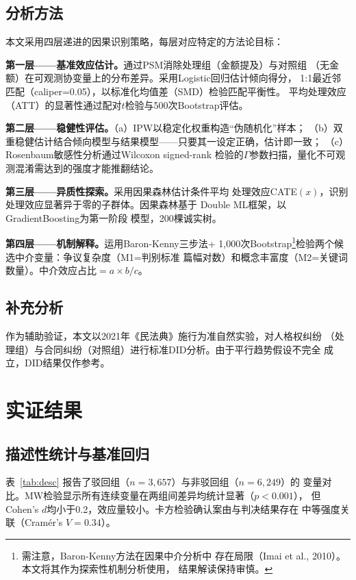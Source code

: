 \documentclass[12pt,a4paper,twoside]{ctexart}
\newcommand{\tabref}[1]{表~\ref{tab:#1}}
\begin{document}
\subsection{分析方法}

本文采用四层递进的因果识别策略，每层对应特定的方法论目标：

\textbf{第一层——基准效应估计。}通过PSM消除处理组（金额提及）与对照组
（无金额）在可观测协变量上的分布差异。采用Logistic回归估计倾向得分，
1:1最近邻匹配（caliper=0.05），以标准化均值差（SMD）检验匹配平衡性。
平均处理效应（ATT）的显著性通过配对$t$检验与500次Bootstrap评估。

\textbf{第二层——稳健性评估。}（a）IPW以稳定化权重构造``伪随机化''样本；
（b）双重稳健估计结合倾向模型与结果模型——只要其一设定正确，估计即一致；
（c）Rosenbaum敏感性分析\cite{rosenbaum1983}通过Wilcoxon signed-rank
检验的$\Gamma$参数扫描，量化不可观测混淆需达到的强度才能推翻结论。

\textbf{第三层——异质性探索。}采用因果森林\cite{wager2018}估计条件平均
处理效应CATE$(x)$，识别处理效应显著异于零的子群体。因果森林基于
Double ML框架\cite{chernozhukov2018}，以GradientBoosting为第一阶段
模型，200棵诚实树。

\textbf{第四层——机制解释。}运用Baron-Kenny三步法\cite{baron1986}+
1,000次Bootstrap\footnote{需注意，Baron-Kenny方法在因果中介分析中
存在局限（Imai et al., 2010）。本文将其作为探索性机制分析使用，
结果解读保持审慎。}检验两个候选中介变量：争议复杂度（M1=判别标准
篇幅对数）和概念丰富度（M2=关键词数量）。中介效应占比$=a\times b / c$。

\subsection{补充分析}

作为辅助验证，本文以2021年《民法典》施行为准自然实验，对人格权纠纷
（处理组）与合同纠纷（对照组）进行标准DID分析。由于平行趋势假设不完全
成立，DID结果仅作参考。

\section{实证结果}

\subsection{描述性统计与基准回归}

\tabref{desc} 报告了驳回组（$n=3,657$）与非驳回组（$n=6,249$）的
变量对比。MW检验显示所有连续变量在两组间差异均统计显著（$p<0.001$），
但Cohen's $d$均小于0.2，效应量较小。卡方检验确认案由与判决结果存在
中等强度关联（Cram\'er's $V=0.34$）。
\end{document}
